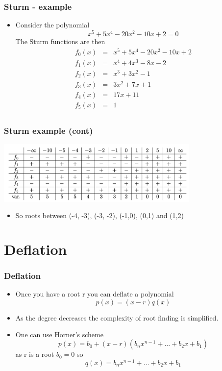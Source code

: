 \documentclass[10pt]{beamer}
\begin{document}
\begin{frame}
  \frametitle{Sturm - example}
  \begin{itemize}
  \item Consider the polynomial
    \[
      x^5 + 5x^4 - 20 x^2 - 10x + 2 =0
    \]
    The Sturm functions are then
    \[
      \begin{array}{rcl}
        f_0(x) & = &  x^5 + 5x^4 - 20 x^2 - 10x + 2\\
        f_1(x) & = &  x^4 + 4 x^3 - 8x - 2\\
        f_2(x) & = &  x^3 + 3 x^2 - 1\\
        f_3(x) & = &  3 x^2 + 7 x +1 \\
        f_4(x) & = &  17x + 11\\
        f_5(x) & = &  1\\
      \end{array}
    \]
  \end{itemize}
\end{frame}

\begin{frame}
  \frametitle{Sturm example (cont)}
  \centerline{\includegraphics[width=10cm]{sturm-figure}}
  \begin{itemize}
  \item So roots between (-4, -3), (-3, -2), (-1,0), (0,1) and (1,2)
  \end{itemize}
\end{frame}


\section{Deflation}

\begin{frame}
  \frametitle{Deflation}
  \begin{itemize}
  \item Once you have a root r you can deflate a polynomial
    \[
      p(x) = (x-r) q(x)
    \]
  \item As the degree decreases the complexity of root finding is simplified. 
  \item One can use Horner's scheme
    \[
      p(x) = b_0 + (x-r)(b_n x^{n-1} + \ldots + b_2 x + b_1)
    \]
    as r is a root $b_0 = 0$ so
    \[
      q(x) = b_n x^{n-1} + \ldots + b_2 x + b_1
    \]
  \end{itemize}
\end{frame}
\end{document}
